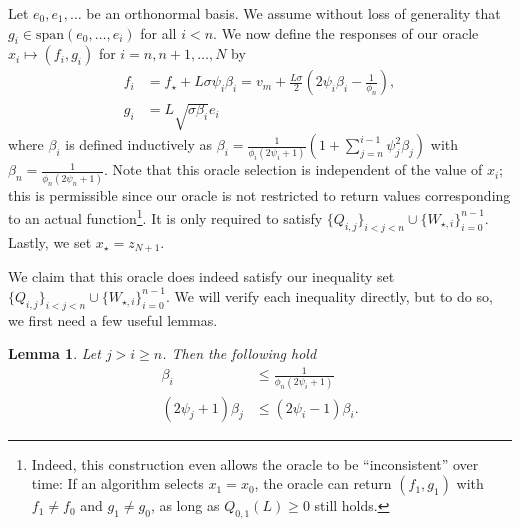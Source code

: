 \documentclass[11pt]{article}
\numberwithin{equation}{section}
\newtheorem{lemma}[thm]{Lemma}
\theoremstyle{definition}
\theoremstyle{plain}
\theoremstyle{definition}
\begin{document}
Let $e_0, e_1, \dots$ be an orthonormal basis. We assume without loss of generality that $g_i \in \text{span}(e_0, \dots, e_i)$ for all $i < n$. We now define the responses of our oracle $x_i \mapsto (f_i, g_i)$ for $i = n, n+1, \dots, N$ by
\begin{align}
    f_i &= f_\star + L \sigma \psi_i \beta_i = v_m + \frac{L \sigma}{2} (2 \psi_i \beta_i - \frac{1}{\phi_n}), \\
    g_i &= L\sqrt{\sigma \beta_i} e_i 
\end{align}
where $\beta_i$ is defined inductively as $\beta_i = \frac{1}{\phi_i(2 \psi_i + 1)} \left( 1 + \sum_{j=n}^{i-1} \psi_j^2 \beta_j\right)$ with $\beta_n = \frac{1}{\phi_n (2\psi_n + 1)}$. Note that this oracle selection is independent of the value of $x_i$; this is permissible since our oracle is not restricted to return values corresponding to an actual function\footnote{Indeed, this construction even allows the oracle to be ``inconsistent'' over time: If an algorithm selects $x_1 = x_0$, the oracle can return $(f_1,g_1)$ with $f_1 \neq f_0$ and $g_1 \neq g_0$, as long as $Q_{0,1}(L) \geq 0$ still holds.}. It is only required to satisfy $\{Q_{i,j}\}_{i < j < n} \cup \{W_{\star,i}\}_{i=0}^{n-1}$. Lastly, we set $x_\star = z_{N+1}$.

We claim that this oracle does indeed satisfy our inequality set $\{Q_{i,j}\}_{i < j < n} \cup \{W_{\star,i}\}_{i=0}^{n-1}$. We will verify each inequality directly, but to do so, we first need a few useful lemmas.

\begin{lemma} \label{Lem:BetaInequalities}
    Let $j > i \geq n$. Then the following hold
    \begin{align}
        \beta_i &\leq \frac{1}{\phi_n (2\psi_i + 1)} \label{Eqn:BetaLemma1} \\
        (2\psi_j + 1) \beta_j & \leq (2 \psi_i - 1) \beta_i. \label{Eqn:BetaLemma2}
    \end{align}
\end{lemma}
\end{document}
